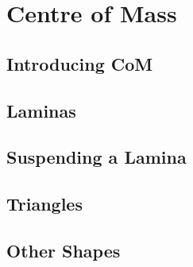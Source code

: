 \documentclass[../maths.tex]{subfiles}
\begin{document}
\chapter{Centre of Mass}
\section{Introducing CoM}
\section{Laminas}
\section{Suspending a Lamina}
\section{Triangles}
\section{Other Shapes}
\end{document}

